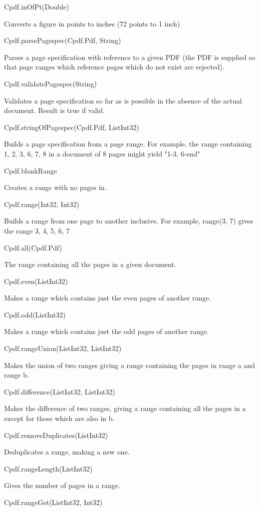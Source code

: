 Cpdf.inOfPt(Double)

Converts a figure in points to inches (72 points to 1 inch)

Cpdf.parsePagespec(Cpdf.Pdf, String)

Parses a page specification with reference to a given PDF (the PDF is supplied
so that page ranges which reference pages which do not exist are rejected).

Cpdf.validatePagespec(String)

Validates a page specification so far as is possible in the absence of the
actual document. Result is true if valid.

Cpdf.stringOfPagespec(Cpdf.Pdf, List{Int32})

Builds a page specification from a page range. For example, the range
containing 1, 2, 3, 6, 7, 8 in a document of 8 pages might yield "1-3, 6-end"

Cpdf.blankRange

Creates a range with no pages in.

Cpdf.range(Int32, Int32)

Builds a range from one page to another inclusive. For example, range(3, 7)
gives the range 3, 4, 5, 6, 7

Cpdf.all(Cpdf.Pdf)

The range containing all the pages in a given document.

Cpdf.even(List{Int32})

Makes a range which contains just the even pages of another range.

Cpdf.odd(List{Int32})

Makes a range which contains just the odd pages of another range.

Cpdf.rangeUnion(List{Int32}, List{Int32})

Makes the union of two ranges giving a range containing the pages in range a
and range b.

Cpdf.difference(List{Int32}, List{Int32})

Makes the difference of two ranges, giving a range containing all the pages in
a except for those which are also in b.

Cpdf.removeDuplicates(List{Int32})

Deduplicates a range, making a new one.

Cpdf.rangeLength(List{Int32})

Gives the number of pages in a range.

Cpdf.rangeGet(List{Int32}, Int32)

